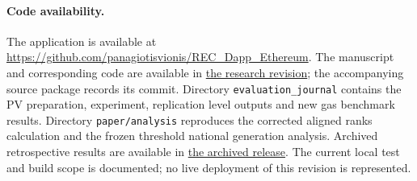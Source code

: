 \documentclass[11pt,a4paper]{article}
\newcommand{\code}[1]{\texttt{\small #1}}
\begin{document}
\paragraph{Code availability.} The application is available at \url{https://github.com/panagiotisvionis/REC_Dapp_Ethereum}. The manuscript and corresponding code are available in \href{https://github.com/panagiotisvionis/REC_Dapp_Ethereum/tree/research/recchain-journal-2026-10-26}{the research revision}; the accompanying source package records its commit. Directory \code{evaluation\_journal} contains the PV preparation, experiment, replication level outputs and new gas benchmark results. Directory \code{paper/analysis} reproduces the corrected aligned ranks calculation and the frozen threshold national generation analysis. Archived retrospective results are available in \href{https://github.com/panagiotisvionis/REC_Dapp_Ethereum/tree/v1.0.1-ee-submission}{the archived release}. The current local test and build scope is documented; no live deployment of this revision is represented.
\end{document}

